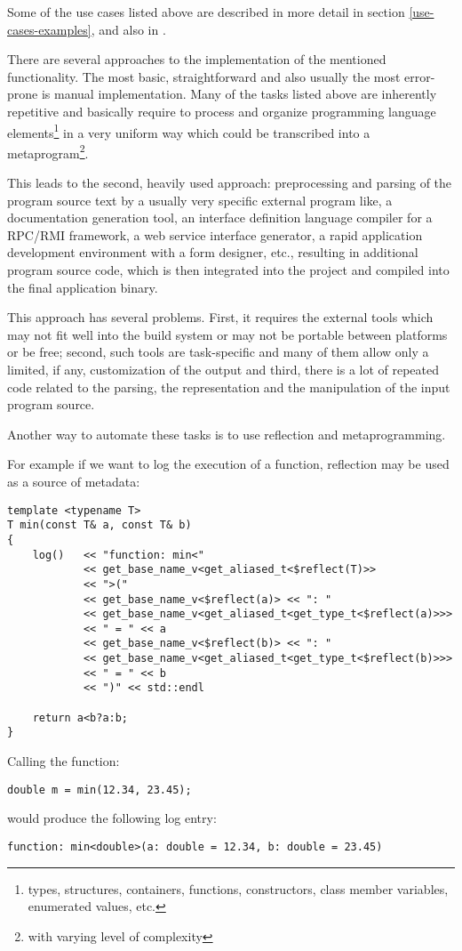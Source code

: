 Some of the use cases listed above are described in more detail in section
\ref{use-cases-examples}, and also in \cite{Chochlik-P0385R1,Chochlik-N4452}.

There are several approaches to the implementation of the mentioned functionality.
The most basic, straightforward and also usually the most
error-prone is manual implementation. Many of the tasks listed above
are inherently repetitive and basically require to process and organize
programming language elements\footnote{types, structures, containers, functions,
constructors, class member variables, enumerated values, etc.}
in a very uniform way which could be transcribed into a metaprogram\footnote{with
varying level of complexity}.

This leads to the second, heavily used approach: preprocessing
and parsing of the program source text by a usually very specific external
program like, a documentation generation tool, an interface definition language
compiler for a RPC/RMI framework, a web service interface generator,
a rapid application development environment with a form designer, etc.,
resulting in additional program source code, which is then integrated into
the project and compiled into the final application binary.

This approach has several problems. First, it requires the external
tools which may not fit well into the build system or may not be portable
between platforms or be free; second, such tools are task-specific
and many of them allow only a limited, if any, customization of the output
and third, there is a lot of repeated code related to the parsing, the
representation and the manipulation of the input program source.

Another way to automate these tasks is to use reflection and metaprogramming.

For example if we want to log the execution of a function, reflection may
be used as a source of metadata:

\begin{verbatim}
template <typename T>
T min(const T& a, const T& b)
{
	log()   << "function: min<"
	        << get_base_name_v<get_aliased_t<$reflect(T)>>
	        << ">("
	        << get_base_name_v<$reflect(a)> << ": "
	        << get_base_name_v<get_aliased_t<get_type_t<$reflect(a)>>>
	        << " = " << a
	        << get_base_name_v<$reflect(b)> << ": "
	        << get_base_name_v<get_aliased_t<get_type_t<$reflect(b)>>>
	        << " = " << b
	        << ")" << std::endl

	return a<b?a:b;
}
\end{verbatim}

Calling the \verb@min@ function:

\begin{verbatim}
double m = min(12.34, 23.45);
\end{verbatim}

would produce the following log entry:

\begin{verbatim}
function: min<double>(a: double = 12.34, b: double = 23.45)
\end{verbatim}

